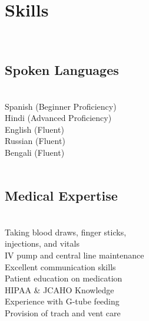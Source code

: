 \documentclass[]{deedy-resume-openfont}
\begin{document}
\begin{minipage}[t]{0.31\textwidth}

\section{Skills}
\\[1\baselineskip]

\subsection{Spoken Languages}
\\[1\baselineskip]
\textbullet{} Spanish (Beginner Proficiency) \\
\sectionsep
\textbullet{} Hindi (Advanced Proficiency) \\
\sectionsep
\textbullet{} English (Fluent) \\
\sectionsep
\textbullet{} Russian (Fluent) \\
\sectionsep
\textbullet{} Bengali (Fluent) \\
\\[1\baselineskip]

\subsection{Medical Expertise}
\\[1\baselineskip]

\textbullet{} Taking blood draws, finger sticks, \\
injections, and vitals \\ 
\sectionsep
\textbullet{} IV pump and central line maintenance \\ 
\sectionsep
\textbullet{} Excellent communication skills \\
\sectionsep
\textbullet{} Patient education on medication \\
\sectionsep
\textbullet{} HIPAA \& JCAHO Knowledge \\
\sectionsep
\textbullet{} Experience with G-tube feeding \\
\sectionsep
\textbullet{} Provision of trach and vent care \\
\\[1\baselineskip]

%
%

\end{minipage} 
\hfill
\end{document}
